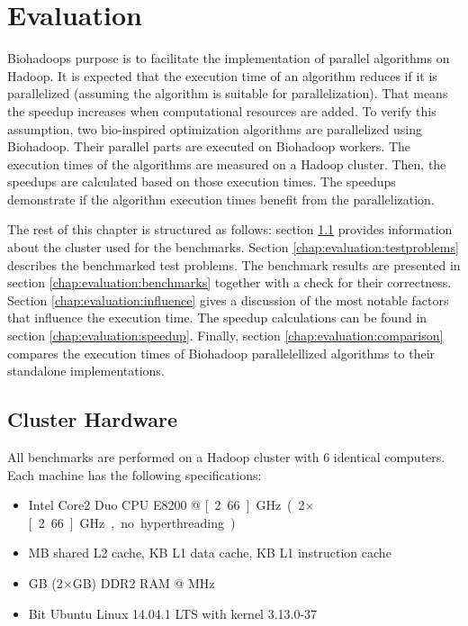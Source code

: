 \chapter{Evaluation}
\label{chap:evaluation}
Biohadoops purpose is to facilitate the implementation of parallel algorithms on Hadoop. It is expected that the execution time of an algorithm reduces if it is parallelized (assuming the algorithm is suitable for parallelization). That means the speedup increases when computational resources are added. To verify this assumption, two bio-inspired optimization algorithms are parallelized using Biohadoop. Their parallel parts are executed on Biohadoop workers. The execution times of the algorithms are measured on a Hadoop cluster. Then, the speedups are calculated based on those execution times. The speedups demonstrate if the algorithm execution times benefit from the parallelization.

The rest of this chapter is structured as follows: section \ref{chap:evaluation:cluster} provides information about the cluster used for the benchmarks. Section \ref{chap:evaluation:testproblems} describes the benchmarked test problems. The benchmark results are presented in section \ref{chap:evaluation:benchmarks} together with a check for their correctness. Section \ref{chap:evaluation:influence} gives a discussion of the most notable factors that influence the execution time. The speedup calculations can be found in section \ref{chap:evaluation:speedup}. Finally, section \ref{chap:evaluation:comparison} compares the execution times of Biohadoop parallelellized algorithms to their standalone implementations.

\section{Cluster Hardware}
\label{chap:evaluation:cluster}
All benchmarks are performed on a Hadoop cluster with 6 identical computers. Each machine has the following specifications:

\begin{itemize}
  \item Intel Core2 Duo CPU E8200 @ \unit[2.66]{GHz} (2$\times$\unit[2.66]{GHz}, no hyperthreading)
  \item \unit[6]{MB} shared L2 cache, \unit[32]{KB} L1 data cache, \unit[32]{KB} L1 instruction cache
  \item \unit[4]{GB} (2$\times$\unit[2]{GB}) DDR2 RAM @ \unit[667]{MHz}
  \item \unit[64]{Bit} Ubuntu Linux 14.04.1 LTS with kernel 3.13.0-37
\end{itemize}

